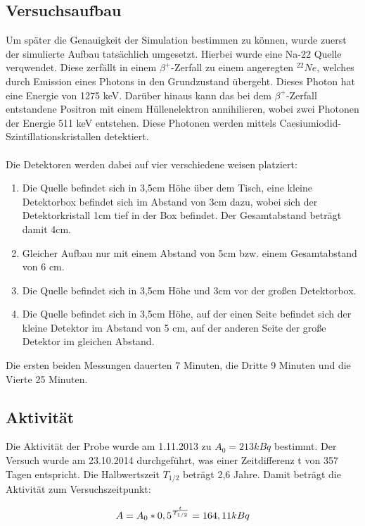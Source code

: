 \documentclass[a4paper,14pt,twoside]{article}
\begin{document}
\subsection{Versuchsaufbau}
Um später die Genauigkeit der Simulation bestimmen zu können, wurde zuerst der simulierte Aufbau tatsächlich umgesetzt. Hierbei wurde eine Na-22 Quelle verqwendet. Diese zerfällt in einem $\beta^+$-Zerfall zu einem angeregten $^{22}Ne$, welches durch Emission eines Photons in den Grundzustand übergeht. Dieses Photon hat eine Energie von 1275 keV. Darüber hinaus kann das bei  dem $\beta^+$-Zerfall entstandene Positron mit einem Hüllenelektron annihilieren, wobei zwei Photonen der Energie 511 keV entstehen.
Diese Photonen werden mittels Caesiumiodid-Szintillationskristallen detektiert. \\\\Die Detektoren werden dabei auf vier verschiedene weisen platziert:
\begin{enumerate}
\item Die Quelle befindet sich in 3,5cm Höhe über dem Tisch, eine kleine Detektorbox befindet sich im Abstand von 3cm dazu, wobei sich der Detektorkristall 1cm tief in der Box befindet. Der Gesamtabstand beträgt damit 4cm.
\item Gleicher Aufbau nur mit einem Abstand von 5cm bzw. einem Gesamtabstand von 6 cm.
\item Die Quelle befindet sich in 3,5cm Höhe und 3cm vor der großen Detektorbox.
\item Die Quelle befindet sich in 3,5cm Höhe, auf der einen Seite befindet sich der kleine Detektor im Abstand von 5 cm, auf der anderen Seite der große Detektor im gleichen Abstand.
\end{enumerate}
Die ersten beiden Messungen dauerten 7 Minuten, die Dritte 9 Minuten und die Vierte 25 Minuten.
\subsection{Aktivität}
Die Aktivität der Probe wurde am 1.11.2013 zu $A_0=213 kBq$ bestimmt. Der Versuch wurde am 23.10.2014 durchgeführt, was einer Zeitdifferenz t von 357 Tagen entspricht. Die Halbwertszeit $T_{1/2}$ beträgt 2,6 Jahre. Damit beträgt die Aktivität zum Versuchszeitpunkt:

\begin{equation}
A=A_0*0,5^{t\over T_{1/2}}=164,11 kBq
\end{equation}
\end{document}
